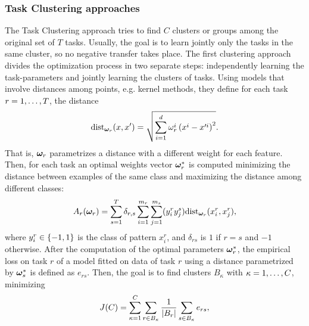 \subsubsection*{Task Clustering approaches}
The Task Clustering approach tries to find $C$ clusters or groups among the original set of $T$ tasks. Usually, the goal is to learn jointly only the tasks in the same cluster, so no negative transfer takes place.
The first clustering approach~\citep{ThrunO96} divides the optimization process in two separate steps: independently learning the task-parameters and jointly learning the clusters of tasks.
Using models that involve distances among points, e.g. kernel methods, they define for each task $r=1, \ldots, T$, the distance
$$ \text{dist}_{\bm{\omega}_r}(x, x') = \sqrt{\sum_{i=1}^d \omega_r^i \left( x^i - x'^i \right)^2}. $$
That is, $\bm{\omega}_r$ parametrizes a distance with a different weight for each feature.
Then, for each task an optimal weights vector $\bm{\omega}_r^*$ is computed minimizing the distance between examples of the same class and maximizing the distance among different classes:
\begin{equation}
    \nonumber
    A_r(\bm{\omega}_r) = \sum_{s=1}^T \delta_{r, s} \sum_{i=1}^{m_r} \sum_{j=1}^{m_s} (y_i^r  y_j^s)  \text{dist}_{\bm{\omega}_r}(x_i^r, x_j^r),
\end{equation}
where $y_i^r \in \left\{-1, 1\right\}$ is the class of pattern $x_i^r$, and $\delta_{rs}$ is $1$ if $r=s$ and $-1$ otherwise.
After the computation of the optimal parameters $\bm{\omega}_r^*$, the empirical loss on task $r$ of a model fitted on data of task $r$ using a distance parametrized by $\bm{\omega}_s^*$ is defined as $e_{rs}$. Then, the goal is to find clusters $B_\kappa$ with $\kappa=1, \ldots, C$, minimizing
\begin{equation}
    \nonumber
    J(C) = \sum_{\kappa = 1}^C \sum_{r \in B_\kappa} \frac{1}{\left|B_r\right|} \sum_{s \in B_\kappa} e_{rs} ,
\end{equation}
